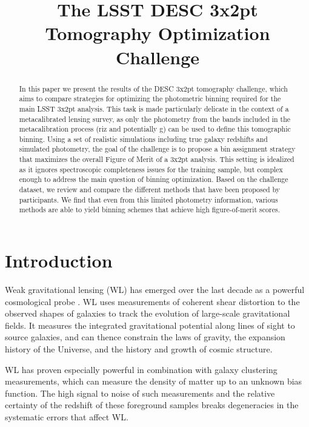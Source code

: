 \documentclass[twocolumn,twocolappendix]{aastex63}
\begin{document}
\title{The LSST DESC 3x2pt Tomography Optimization Challenge}


\begin{abstract}
In this paper we present the results of the DESC 3x2pt tomography challenge,
which aims to compare strategies for optimizing the photometric binning required
for the main LSST 3x2pt analysis. This task is made particularly delicate in the
context of a metacalibrated lensing survey, as only the photometry from the
bands  included in the metacalibration process (riz and potentially g) can be
used to define this tomographic binning. Using a set of realistic simulations
including true galaxy redshifts and simulated photometry, the goal of the
challenge is to propose a bin assignment strategy that maximizes the overall
Figure of Merit of a 3x2pt analysis. This setting is idealized as it ignores
spectroscopic completeness  issues for the training sample, but complex enough
to address the main question of binning optimization. Based on the challenge
dataset, we review and compare the different methods that have been proposed by
participants. We find that even from this limited photometry information,
various methods are able to yield binning schemes that achieve high figure-of-merit scores.
\end{abstract}





\section{Introduction}
Weak gravitational lensing (WL) has emerged over the last decade as a powerful
cosmological probe \citep{cfhtlens,rcslens,des,kids,hsc}.  WL
uses measurements of coherent shear distortion to the observed shapes of galaxies
to track the evolution of large-scale gravitational fields.  It measures the integrated
gravitational potential along lines of sight to source galaxies, and can thence constrain
the laws of gravity, the expansion history of the Universe, and the history and growth
of cosmic structure.

WL has proven especially powerful in combination with galaxy clustering measurements,
which can measure the density of matter up to an unknown bias function.  The high signal
to noise of such measurements and the relative certainty of the redshift of these foreground
samples breaks degeneracies in the systematic errors that affect WL.
\end{document}
